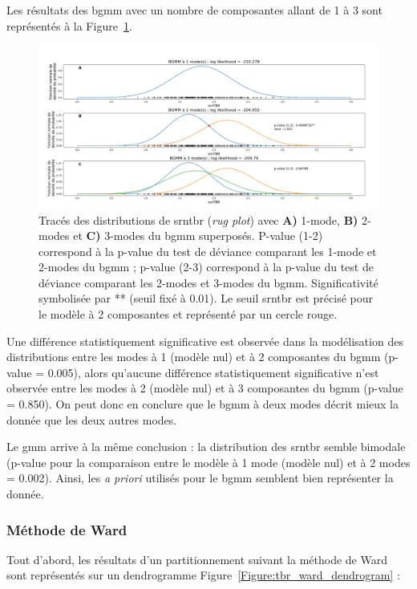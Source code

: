 Les résultats des \gls{bgmm} avec un nombre de composantes allant de 1 à 3 sont représentés à la Figure~\ref{Figure:tbr_bgmm}. 

\begin{figure}[h!]
  \centering
	\includegraphics[width=1.0\linewidth]{figures/chapter-4/tbr-bgmm} 
  \caption{Tracés des distributions de \gls{srntbr} (\textit{rug plot}) avec \textbf{A)} 1-mode, \textbf{B)} 2-modes et \textbf{C)} 3-modes du \gls{bgmm} superposés. P-value (1-2) correspond
	à la p-value du test de déviance comparant les 1-mode et 2-modes du \gls{bgmm} ; p-value (2-3) correspond à la p-value du test de déviance comparant les 2-modes et 3-modes du \gls{bgmm}. 
	Significativité symbolisée par ** (seuil fixé à 0.01). Le seuil \gls{srntbr} est précisé pour le modèle à 2 composantes et représenté par un cercle rouge.}
  \label{Figure:tbr_bgmm} 
\end{figure}

Une différence statistiquement significative est observée dans la modélisation des distributions entre les modes à 1 (modèle nul) et à 2 composantes 
du \gls{bgmm} (p-value = 0.005), alors qu'aucune différence statistiquement significative n'est observée entre les modes à 2 (modèle nul) 
et à 3 composantes du \gls{bgmm} (p-value = 0.850). On peut donc en conclure que le \gls{bgmm} à deux modes décrit mieux la donnée que les deux
autres modes. 

Le \gls{gmm} arrive à la même conclusion : la distribution des \gls{srntbr} semble bimodale (p-value pour la comparaison
entre le modèle à 1 mode (modèle nul) et à 2 modes = 0.002). Ainsi, les \textit{a priori} utilisés pour le \gls{bgmm} semblent bien 
représenter la donnée. 

\subsubsection{Méthode de Ward}
Tout d'abord, les résultats d'un partitionnement suivant la méthode de Ward sont représentés sur un dendrogramme Figure~\ref{Figure:tbr_ward_dendrogram} :

